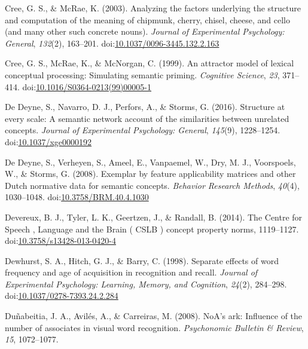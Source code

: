 \documentclass[english,,man]{apa6}
\theoremstyle{definition}
\theoremstyle{definition}
\theoremstyle{definition}
\theoremstyle{remark}
\begin{document}
\leavevmode\hypertarget{ref-Cree2003}{}%
Cree, G. S., \& McRae, K. (2003). Analyzing the factors underlying the
structure and computation of the meaning of chipmunk, cherry, chisel,
cheese, and cello (and many other such concrete nouns). \emph{Journal of
Experimental Psychology: General}, \emph{132}(2), 163--201.
doi:\href{https://doi.org/10.1037/0096-3445.132.2.163}{10.1037/0096-3445.132.2.163}

\leavevmode\hypertarget{ref-Cree1999}{}%
Cree, G. S., McRae, K., \& McNorgan, C. (1999). An attractor model of
lexical conceptual processing: Simulating semantic priming.
\emph{Cognitive Science}, \emph{23}, 371--414.
doi:\href{https://doi.org/10.1016/S0364-0213(99)00005-1}{10.1016/S0364-0213(99)00005-1}

\leavevmode\hypertarget{ref-DeDeyne2016}{}%
De Deyne, S., Navarro, D. J., Perfors, A., \& Storms, G. (2016).
Structure at every scale: A semantic network account of the similarities
between unrelated concepts. \emph{Journal of Experimental Psychology:
General}, \emph{145}(9), 1228--1254.
doi:\href{https://doi.org/10.1037/xge0000192}{10.1037/xge0000192}

\leavevmode\hypertarget{ref-DeDeyne2008}{}%
De Deyne, S., Verheyen, S., Ameel, E., Vanpaemel, W., Dry, M. J.,
Voorspoels, W., \& Storms, G. (2008). Exemplar by feature applicability
matrices and other Dutch normative data for semantic concepts.
\emph{Behavior Research Methods}, \emph{40}(4), 1030--1048.
doi:\href{https://doi.org/10.3758/BRM.40.4.1030}{10.3758/BRM.40.4.1030}

\leavevmode\hypertarget{ref-Devereux2014}{}%
Devereux, B. J., Tyler, L. K., Geertzen, J., \& Randall, B. (2014). The
Centre for Speech , Language and the Brain ( CSLB ) concept property
norms, 1119--1127.
doi:\href{https://doi.org/10.3758/s13428-013-0420-4}{10.3758/s13428-013-0420-4}

\leavevmode\hypertarget{ref-Dewhurst1998}{}%
Dewhurst, S. A., Hitch, G. J., \& Barry, C. (1998). Separate effects of
word frequency and age of acquisition in recognition and recall.
\emph{Journal of Experimental Psychology: Learning, Memory, and
Cognition}, \emph{24}(2), 284--298.
doi:\href{https://doi.org/10.1037/0278-7393.24.2.284}{10.1037/0278-7393.24.2.284}

\leavevmode\hypertarget{ref-Dunabeitia2008}{}%
Duñabeitia, J. A., Avilés, A., \& Carreiras, M. (2008). NoA's ark:
Influence of the number of associates in visual word recognition.
\emph{Psychonomic Bulletin \& Review}, \emph{15}, 1072--1077.
\end{document}
